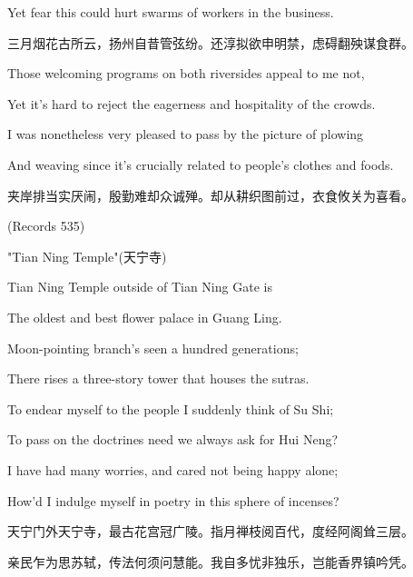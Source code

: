 \begin{BookQuote}
Yet fear this could hurt swarms of workers in the business.
\end{BookQuote}

\begin{BookQuote}
三月烟花古所云，扬州自昔管弦纷。还淳拟欲申明禁，虑碍翻殃谋食群。
\end{BookQuote}

\begin{BookQuote}
Those welcoming programs on both riversides appeal to me not,
\end{BookQuote}

\begin{BookQuote}
Yet it's hard to reject the eagerness and hospitality of the crowds.
\end{BookQuote}

\begin{BookQuote}
I was nonetheless very pleased to pass by the picture of plowing
\end{BookQuote}

\begin{BookQuote}
And weaving since it's crucially related to people's clothes and foods.
\end{BookQuote}

\begin{BookQuote}
夹岸排当实厌闹，殷勤难却众诚殚。却从耕织图前过，衣食攸关为喜看。
\end{BookQuote}

(Records 535)


"Tian Ning Temple"(天宁寺)

Tian Ning Temple outside of Tian Ning Gate is

The oldest and best flower palace in Guang Ling.

Moon-pointing branch's seen a hundred generations;

There rises a three-story tower that houses the sutras.

To endear myself to the people I suddenly think of Su Shi;

To pass on the doctrines need we always ask for Hui Neng?

I have had many worries, and cared not being happy alone;

How'd I indulge myself in poetry in this sphere of incenses?

天宁门外天宁寺，最古花宫冠广陵。指月禅枝阅百代，度经阿阁耸三层。

亲民乍为思苏轼，传法何须问慧能。我自多忧非独乐，岂能香界镇吟凭。

